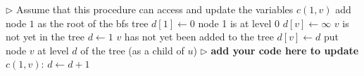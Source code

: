 \documentclass[11pt,fleqn]{exam}
\begin{document}
\begin{questions}
 \begin{algorithmic}
\State $\triangleright$ Assume that this procedure can access and update the variables $c(1,v)$
\State add node $1$ as the root of the bfs tree
\State $d[1] \gets 0$ \Comment node 1 is at level 0
   \State $d[v] \gets \infty$ \Comment $v$ is not yet in the tree
\EndFor
\State $d \gets 1$
         \Comment $v$ has not yet been added to the tree
           \State $d[v] \gets d$  \Comment put node $v$ at level $d$ of the tree (as a child of $u$)
        \EndIf
           \State $\triangleright$ {\bf add your code here to update $c(1,v)$}:
           \State
           \State
           \State
     \EndFor
   \EndFor
   \State $d \gets d+1$        
\EndWhile
\EndProcedure
  \end{algorithmic}
  
 \end{questions}

\clearpage

\end{document}
